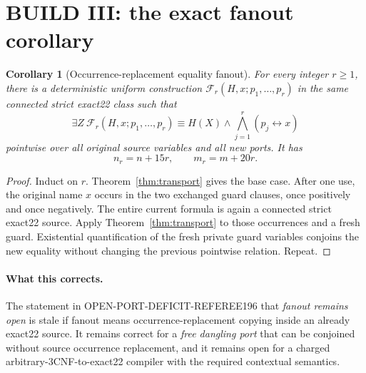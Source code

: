 \documentclass[11pt]{article}
\newtheorem{corollary}{Corollary}
\begin{document}
\section{BUILD III: the exact fanout corollary}
\begin{corollary}[Occurrence-replacement equality fanout]\label{cor:fanout}
For every integer \(r\ge1\), there is a deterministic uniform construction
\(\mathcal F_r(H,x;p_1,\ldots,p_r)\) in the same connected strict exact22
class such that
\[
 \exists Z\ \mathcal F_r(H,x;p_1,\ldots,p_r)
 \equiv H(X)\wedge\bigwedge_{j=1}^{r}(p_j\leftrightarrow x)
\]
pointwise over all original source variables and all new ports.  It has
\[
 n_r=n+15r,\qquad m_r=m+20r.
\]
\end{corollary}
\begin{proof}
Induct on \(r\).  Theorem~\ref{thm:transport} gives the base case.  After
one use, the original name \(x\) occurs in the two exchanged guard clauses,
once positively and once negatively.  The entire current formula is again a
connected strict exact22 source.  Apply Theorem~\ref{thm:transport} to those
occurrences and a fresh guard.  Existential quantification of the fresh
private guard variables conjoins the new equality without changing the
previous pointwise relation.  Repeat.
\end{proof}

\paragraph{What this corrects.}
The statement in OPEN-PORT-DEFICIT-REFEREE196 that \emph{fanout remains open}
is stale if fanout means occurrence-replacement copying inside an already
exact22 source.  It remains correct for a \emph{free dangling port} that can
be conjoined without source occurrence replacement, and it remains open for
a charged arbitrary-3CNF-to-exact22 compiler with the required contextual
semantics.
\end{document}
